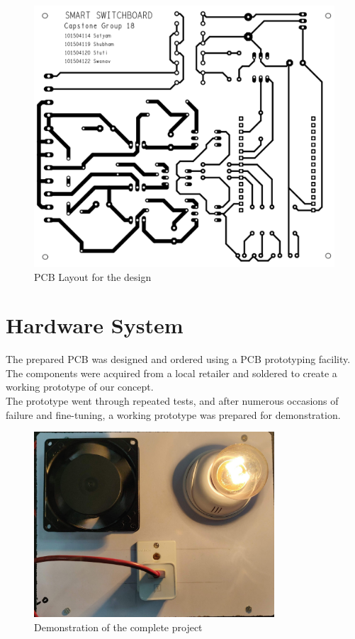 	        \begin{figure}[h!]
	        	\centering
	        	\includegraphics[width=\textwidth]{photos/hardware/PCBDesign.png}
	        	\caption{PCB Layout for the design}
	        \end{figure}
		 
        \section{Hardware System}
        
        	The prepared PCB was designed and ordered using a PCB prototyping facility. The components were acquired from a local retailer and soldered to create a working prototype of our concept.\\
        	
        	The prototype went through repeated tests, and after numerous occasions of failure and fine-tuning, a working prototype was prepared for demonstration. \\
        
	        \begin{figure}[H]
	        	\centering
	        	\includegraphics[width=0.8\textwidth]{photos/hardware/sb_on.jpg}
	        	\caption{Demonstration of the complete project}
	        \end{figure}

